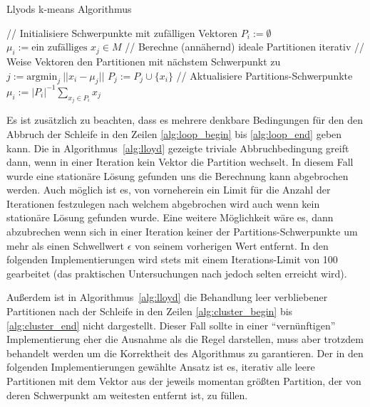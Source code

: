 \documentclass[ngerman, cd=lightcolor, cdmath=false]{tudscrreprt}
\begin{document}
\begin{algorithm}
    \caption{Llyods k-means Algorithmus}
    \begin{algorithmic}[1]
            \State // Initialisiere Schwerpunkte mit zufälligen Vektoren
                \State $P_i := \emptyset$
                \State $\mu_i := \text{ein zufälliges } x_j \in M$
            \EndFor
            \State // Berechne (annähernd) ideale Partitionen iterativ
             \label{alg:loop_begin}
                \State // Weise Vektoren den Partitionen mit nächstem Schwerpunkt zu
                 \label{alg:cluster_begin}
                    \State $j := \mathrm{argmin}_j\ ||x_i - \mu_j||$
                    \State $P_j := P_j \cup \{x_i\}$
                \EndFor \label{alg:cluster_end}
                \State // Aktualisiere Partitions-Schwerpunkte
                    \State $\mu_i := |P_i|^{-1} \sum_{x_j \in P_i} x_j$
                \EndFor
            \EndWhile \label{alg:loop_end}
        \EndProcedure
    \end{algorithmic}
    \label{alg:lloyd}
\end{algorithm}

Es ist zusätzlich zu beachten, dass es mehrere denkbare Bedingungen für den den
Abbruch der Schleife in den Zeilen \ref{alg:loop_begin} bis \ref{alg:loop_end}
geben kann. Die in Algorithmus~\ref{alg:lloyd} gezeigte triviale
Abbruchbedingung greift dann, wenn in einer Iteration kein Vektor die Partition
wechselt. In diesem Fall wurde eine stationäre Lösung gefunden uns die
Berechnung kann abgebrochen werden. Auch möglich ist es, von vorneherein ein
Limit für die Anzahl der Iterationen festzulegen nach welchem abgebrochen wird
auch wenn kein stationäre Lösung gefunden wurde. Eine weitere Möglichkeit wäre
es, dann abzubrechen wenn sich in einer Iteration keiner der
Partitions-Schwerpunkte um mehr als einen Schwellwert $\epsilon$ von seinem
vorherigen Wert entfernt. In den folgenden Implementierungen wird stets mit
einem Iterations-Limit von 100 gearbeitet (das praktischen Untersuchungen nach
jedoch selten erreicht wird).

Außerdem ist in Algorithmus~\ref{alg:lloyd} die Behandlung leer verbliebener
Partitionen nach der Schleife in den Zeilen \ref{alg:cluster_begin} bis
\ref{alg:cluster_end} nicht dargestellt. Dieser Fall sollte in einer
``vernünftigen'' Implementierung eher die Ausnahme als die Regel darstellen,
muss aber trotzdem behandelt werden um die Korrektheit des Algorithmus zu
garantieren. Der in den folgenden Implementierungen gewählte Ansatz ist es,
iterativ alle leere Partitionen mit dem Vektor aus der jeweils momentan größten
Partition, der von deren Schwerpunkt am weitesten entfernt ist, zu füllen.
\end{document}
